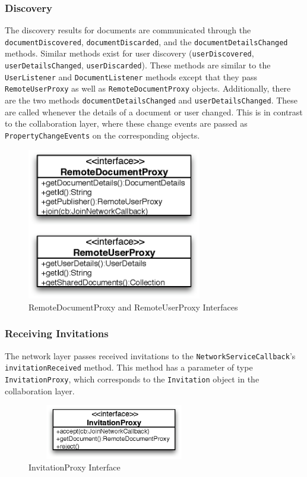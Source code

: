\subsubsection{Discovery}
The discovery results for documents are communicated through the 
\texttt{documentDiscovered},
\texttt{documentDiscarded}, and the
\texttt{documentDetailsChanged} methods. Similar methods exist for user
discovery (\texttt{userDiscovered}, \texttt{userDetailsChanged}, 
\texttt{userDiscarded}). These methods are similar to the 
\texttt{UserListener} and \texttt{DocumentListener} methods except that they
pass \texttt{RemoteUserProxy} as well as \texttt{RemoteDocumentProxy} 
objects. Additionally, there are the two methods \texttt{documentDetailsChanged}
and \texttt{userDetailsChanged}. These are called whenever the details of
a document or user changed. This is in contrast to the collaboration layer,
where these change events are passed as \texttt{PropertyChangeEvents} on 
the corresponding objects.

\begin{figure}[H]
 \centering
 \includegraphics[width=7.62cm,height=6.63cm]{../images/finalreport/architecture_userdocumentproxy_uml.eps}
 \caption{RemoteDocumentProxy and RemoteUserProxy Interfaces}
 \label{fig:archoverview.userdocumentproxy}
\end{figure}


\subsubsection{Receiving Invitations}
The network layer passes received invitations to the 
\texttt{Network\-Service\-Callback}'s \texttt{invitation\-Received} method.
This method has a parameter of type \texttt{Invitation\-Proxy}, which 
corresponds to the \texttt{Invitation} object in the collaboration layer.

\begin{figure}[H]
 \centering
 \includegraphics[width=7.62cm,height=2.40cm]{../images/finalreport/architecture_invitationproxy_uml.eps}
 \caption{InvitationProxy Interface}
\end{figure}

